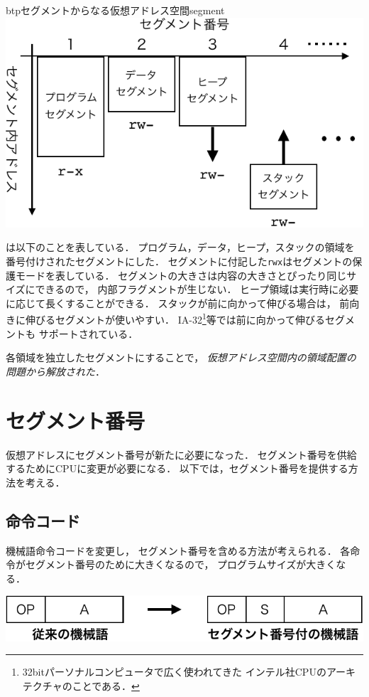 \begin{myfig}{btp}{セグメントからなる仮想アドレス空間}{segment}
  \includegraphics[scale=0.8]{Fig/segment-crop.pdf}
\end{myfig}

は以下のことを表している．
プログラム，データ，ヒープ，スタックの領域を番号付けされたセグメントにした．
セグメントに付記した\texttt{rwx}はセグメントの保護モードを表している．
セグメントの大きさは内容の大きさとぴったり同じサイズにできるので，
内部フラグメントが生じない．
ヒープ領域は実行時に必要に応じて長くすることができる．
スタックが前に向かって伸びる場合は，
前向きに伸びるセグメントが使いやすい．
IA-32\footnote{
  32bitパーソナルコンピュータで広く使われてきた
  インテル社CPUのアーキテクチャのことである．
}等では前に向かって伸びるセグメントも
サポートされている\cite{ia32Segmentation}．

各領域を独立したセグメントにすることで，
\emph{仮想アドレス空間内の領域配置の問題から解放された}．

\section{セグメント番号}
仮想アドレスにセグメント番号が新たに必要になった．
セグメント番号を供給するためにCPUに変更が必要になる．
以下では，セグメント番号を提供する方法を考える．

\subsection{命令コード}
機械語命令コードを変更し，
セグメント番号を含める方法が考えられる．
各命令がセグメント番号のために大きくなるので，
プログラムサイズが大きくなる．
\begin{center}
  \includegraphics[scale=0.7]{Fig/segmentationInstruction-crop.pdf}
\end{center}

